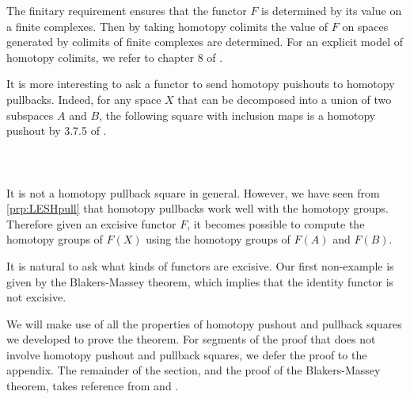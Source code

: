 The finitary requirement ensures that the functor $F$ is determined by its value on a finite complexes. Then by taking homotopy colimits the value of $F$ on spaces generated by colimits of finite complexes are determined. For an explicit model of homotopy colimits, we refer to chapter 8 of \cite{CHT}. 

It is more interesting to ask a functor to send homotopy puishouts to homotopy pullbacks. Indeed, for any space $X$ that can be decomposed into a union of two subspaces $A$ and $B$, the following square with inclusion maps is a homotopy pushout by 3.7.5 of \cite{CHT}. 
 \\~\\  \\~\\
It is not a homotopy pullback square in general. However, we have seen from \ref{prp:LESHpull} that homotopy pullbacks work well with the homotopy groups. Therefore given an excisive functor $F$, it becomes possible to compute the homotopy groups of $F(X)$ using the homotopy groups of $F(A)$ and $F(B)$. 

It is natural to ask what kinds of functors are excisive. Our first non-example is given by the Blakers-Massey theorem, which implies that the identity functor is not excisive. 

We will make use of all the properties of homotopy pushout and pullback squares we developed to prove the theorem. For segments of the proof that does not involve homotopy pushout and pullback squares, we defer the proof to the appendix. The remainder of the section, and the proof of the Blakers-Massey theorem, takes reference from \cite{CHT} and \cite{ATTD}. 


